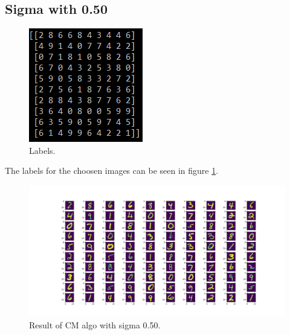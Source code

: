 \documentclass{article}
\begin{document}
\subsection{Sigma with 0.50}
\begin{figure}[!h]
  \includegraphics[width=\linewidth]{sigma_050_sol.png}
  \caption{Labels.}
  \label{fig:sol050}
\end{figure}

The labels for the choosen images can be seen in figure \ref{fig:sol050}.
\begin{figure}[h]
  \includegraphics[width=\linewidth]{sigma_050_cm.png}
  \caption{Result of CM algo with sigma 0.50.}
  \label{fig:cm050}
\end{figure}
\end{document}
